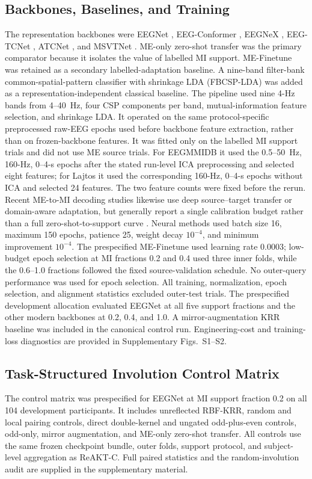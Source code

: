 \documentclass[preprint,12pt]{elsarticle}
\begin{document}
\subsection{Backbones, Baselines, and Training}
The representation backbones were EEGNet \cite{lawhern2018eegnet}, EEG-Conformer \cite{song2023eegconformer}, EEGNeX \cite{chen2024eegnex}, EEG-TCNet \cite{ingolfsson2020eegtcnet}, ATCNet \cite{altaheri2023atcnet}, and MSVTNet \cite{liu2024msvtnet}. ME-only zero-shot transfer was the primary comparator because it isolates the value of labelled MI support. ME-Finetune was retained as a secondary labelled-adaptation baseline. A nine-band filter-bank common-spatial-pattern classifier with shrinkage LDA (FBCSP-LDA) was added as a representation-independent classical baseline. The pipeline used nine 4-Hz bands from 4--40~Hz, four CSP components per band, mutual-information feature selection, and shrinkage LDA. It operated on the same protocol-specific preprocessed raw-EEG epochs used before backbone feature extraction, rather than on frozen-backbone features. It was fitted only on the labelled MI support trials and did not use ME source trials. For EEGMMIDB it used the 0.5--50~Hz, 160-Hz, 0--4-s epochs after the stated run-level ICA preprocessing and selected eight features; for Lajtos it used the corresponding 160-Hz, 0--4-s epochs without ICA and selected 24 features. The two feature counts were fixed before the rerun. Recent ME-to-MI decoding studies likewise use deep source--target transfer or domain-aware adaptation, but generally report a single calibration budget rather than a full zero-shot-to-support curve \cite{kaviri2025me_mi,wang2026me_mi}. Neural methods used batch size 16, maximum 150 epochs, patience 25, weight decay $10^{-4}$, and minimum improvement $10^{-4}$. The prespecified ME-Finetune used learning rate 0.0003; low-budget epoch selection at MI fractions 0.2 and 0.4 used three inner folds, while the 0.6--1.0 fractions followed the fixed source-validation schedule. No outer-query performance was used for epoch selection. All training, normalization, epoch selection, and alignment statistics excluded outer-test trials. The prespecified development allocation evaluated EEGNet at all five support fractions and the other modern backbones at 0.2, 0.4, and 1.0. A mirror-augmentation KRR baseline was included in the canonical control run. Engineering-cost and training-loss diagnostics are provided in Supplementary Figs.~S1--S2.

\subsection{Task-Structured Involution Control Matrix}
The control matrix was prespecified for EEGNet at MI support fraction 0.2 on
all 104 development participants. It includes unreflected RBF-KRR, random and
local pairing controls, direct double-kernel and ungated odd-plus-even
controls, odd-only, mirror augmentation, and ME-only zero-shot transfer. All
controls use the same frozen checkpoint bundle, outer folds, support protocol,
and subject-level aggregation as ReAKT-C. Full paired statistics and the
random-involution audit are supplied in the supplementary material.
\end{document}
